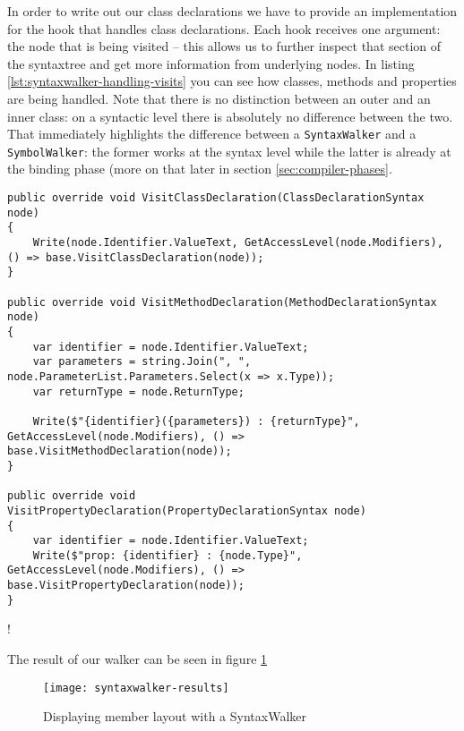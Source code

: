 In order to write out our class declarations we have to provide an implementation for the hook that handles class declarations. Each hook receives one argument: the node that is being visited -- this allows us to further inspect that section of the \gls{syntaxtree} and get more information from underlying nodes. In listing \ref{lst:syntaxwalker-handling-visits} you can see how classes, methods and properties are being handled. Note that there is no distinction between an outer and an inner class: on a syntactic level there is absolutely no difference between the two. That immediately highlights the difference between a \texttt{SyntaxWalker} and a \texttt{SymbolWalker}: the former works at the \gls{syntax} level while the latter is already at the binding phase (more on that later in section \ref{sec:compiler-phases}.

\begin{lstlisting}[label={lst:syntaxwalker-handling-visits}]
public override void VisitClassDeclaration(ClassDeclarationSyntax node)
{
    Write(node.Identifier.ValueText, GetAccessLevel(node.Modifiers), () => base.VisitClassDeclaration(node));
}

public override void VisitMethodDeclaration(MethodDeclarationSyntax node)
{
	var identifier = node.Identifier.ValueText;
	var parameters = string.Join(", ", node.ParameterList.Parameters.Select(x => x.Type));
	var returnType = node.ReturnType;

	Write($"{identifier}({parameters}) : {returnType}", GetAccessLevel(node.Modifiers), () => base.VisitMethodDeclaration(node));
}

public override void VisitPropertyDeclaration(PropertyDeclarationSyntax node)
{
	var identifier = node.Identifier.ValueText;
	Write($"prop: {identifier} : {node.Type}", GetAccessLevel(node.Modifiers), () => base.VisitPropertyDeclaration(node));
}
\end{lstlisting}
\ifx{\verb+$$+}!\fi %


\noindent The result of our walker can be seen in figure \ref{syntaxwalker-results}

\begin{figure}[H]
\centering
\texttt{[image: syntaxwalker-results]}
\caption[Displaying member layout with a SyntaxWalker]{Displaying member layout with a SyntaxWalker}
\label{syntaxwalker-results}
\end{figure}


